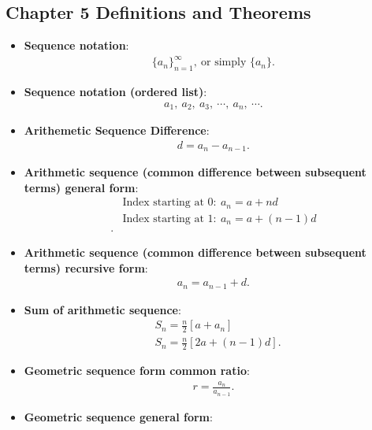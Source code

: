 \documentclass{report}
\begin{document}
\subsection{Chapter 5 Definitions and Theorems}
\bigbreak \noindent 
\begin{itemize}
    \item \textbf{Sequence notation}:
        \begin{align*}
            \{a_{n}\}_{n=1}^{\infty},\ \text{or simply } \{a_{n}\}
        .\end{align*}
    \item \textbf{Sequence notation (ordered list)}:
        \begin{align*}
            a_{1},\ a_{2},\ a_{3},\ \cdots,\ a_{n},\ \cdots
        .\end{align*}
    \item \textbf{Arithemetic Sequence Difference}:
        \begin{align*}
            d = a_{n} - a_{n-1}
        .\end{align*}
    \item \textbf{Arithmetic sequence (common difference between subsequent terms) general form}:
        \begin{align*}
            &\text{Index starting at 0}:\ a_{n} = a + nd \\
            &\text{Index starting at 1}:\ a_{n} = a + (n-1)d \\
        .\end{align*}
    \item \textbf{Arithmetic sequence (common difference between subsequent terms) recursive form}:
        \begin{align*}
            a_{n} = a_{n-1} + d
        .\end{align*}
    \item \textbf{Sum of arithmetic sequence}:
        \begin{align*}
            &S_{n} = \frac{n}{2}\left[a + a_{n}\right] \\
            &S_{n} = \frac{n}{2}\left[2a + (n-1)d\right]
        .\end{align*}
    \item \textbf{Geometric sequence form common ratio}:
        \begin{align*}
            r = \frac{a_{n}}{a_{n-1}}
        .\end{align*}
    \item \textbf{Geometric sequence general form}:
        \begin{align*}

\end{align*}
\end{itemize}
\end{document}

